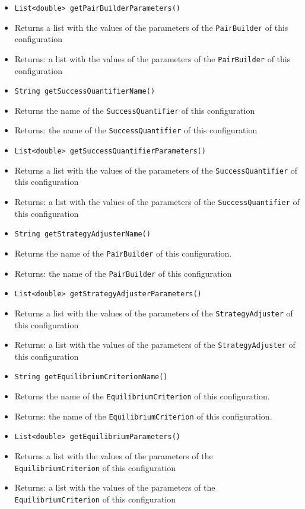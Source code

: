 \documentclass[parskip=full,11pt]{scrartcl}
\begin{document}
\begin{itemize}
	\item \texttt{List<double> getPairBuilderParameters()}
	\item[] Returns a list with the values of the parameters of the \texttt{PairBuilder} of this configuration
	\item[] Returns: a list with the values of the parameters of the \texttt{PairBuilder} of this configuration
	
	\item \texttt{String getSuccessQuantifierName()}
	\item[] Returns the name of the \texttt{SuccessQuantifier} of this configuration
	\item[] Returns: the name of the \texttt{SuccessQuantifier} of this configuration
	
	\item \texttt{List<double> getSuccessQuantifierParameters()}
	\item[] Returns a list with the values of the parameters of the \texttt{SuccessQuantifier} of this configuration
	\item[] Returns: a list with the values of the parameters of the \texttt{SuccessQuantifier} of this configuration
	
	\item \texttt{String getStrategyAdjusterName()}
	\item[] Returns the name of the \texttt{PairBuilder} of this configuration.
	\item[] Returns: the name of the \texttt{PairBuilder} of this configuration
	
	\item \texttt{List<double> getStrategyAdjusterParameters()}
	\item[] Returns a list with the values of the parameters of the \texttt{StrategyAdjuster} of this configuration
	\item[] Returns: a list with the values of the parameters of the \texttt{StrategyAdjuster} of this configuration
	
	
	\item \texttt{String getEquilibriumCriterionName()}
	\item[] Returns the name of the \texttt{EquilibriumCriterion} of this configuration.
	\item[] Returns: the name of the \texttt{EquilibriumCriterion} of this configuration.
	
	\item \texttt{List<double> getEquilibriumParameters()}
	\item[] Returns a list with the values of the parameters of the \texttt{EquilibriumCriterion} of this configuration
	\item[] Returns: a list with the values of the parameters of the \texttt{EquilibriumCriterion} of this configuration
	

\end{itemize}
\end{document}
